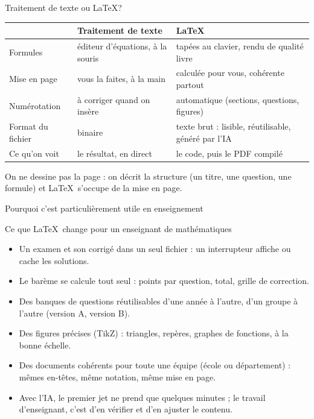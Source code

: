 \begin{frame}{Traitement de texte ou \LaTeX ?}
  \small
  \begin{center}
  \begin{tabular}{p{3.2cm}p{4.3cm}p{4.3cm}}
    \toprule
    & Traitement de texte & \LaTeX \\
    \midrule
    Formules & éditeur d'équations, à la souris & tapées au clavier, rendu
      de qualité livre \\
    Mise en page & vous la faites, à la main & calculée pour vous,
      cohérente partout \\
    Numérotation & à corriger quand on insère & automatique (sections,
      questions, figures) \\
    Format du fichier & binaire & texte brut : lisible, réutilisable,
      généré par l'IA \\
    Ce qu'on voit & le résultat, en direct & le code, puis le PDF
      compilé \\
    \bottomrule
  \end{tabular}
  \end{center}
  \vspace{4pt}
  On ne dessine pas la page : on décrit la structure (un titre, une
  question, une formule) et \LaTeX\ s'occupe de la mise en page.
\end{frame}

\begin{frame}{Pourquoi c'est particulièrement utile en enseignement}
  \begin{Classe}{Ce que \LaTeX\ change pour un enseignant de mathématiques}
    \small
    \begin{itemize}
      \item Un examen et son corrigé dans un seul fichier : un
        interrupteur affiche ou cache les solutions.
      \item Le barème se calcule tout seul : points par question,
        total, grille de correction.
      \item Des banques de questions réutilisables d'une année à l'autre,
        d'un groupe à l'autre (version A, version B).
      \item Des figures précises (TikZ) : triangles, repères, graphes de
        fonctions, à la bonne échelle.
      \item Des documents cohérents pour toute une équipe (école ou département) :
        mêmes en-têtes, même notation, même mise en page.
      \item Avec l'IA, le premier jet ne prend que quelques minutes ;
        le travail d'enseignant, c'est d'en vérifier et d'en ajuster le
        contenu.
    \end{itemize}
  \end{Classe}
\end{frame}


